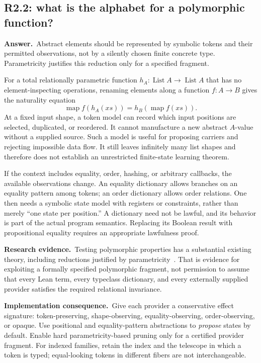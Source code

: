 \documentclass[11pt,a4paper]{article}
\theoremstyle{definition}
\theoremstyle{remark}
\newcommand{\code}[1]{\texttt{\detokenize{#1}}}
\newcommand{\List}{\operatorname{List}}
\newcommand{\ans}{\noindent\textbf{Answer.}\ }
\newcommand{\imp}{\par\noindent\textbf{Implementation consequence.}\ }
\newcommand{\lit}{\par\noindent\textbf{Research evidence.}\ }
\begin{document}
\subsection{R2.2: what is the alphabet for a polymorphic function?}\label{q:R2.2}
\ans Abstract elements should be represented by symbolic tokens and their
permitted observations, not by a silently chosen finite concrete type.
Parametricity justifies this reduction only for a specified fragment.

For a total relationally parametric function
$h_A:\List A\to\List A$ that has no element-inspecting operations, renaming
elements along a function $f:A\to B$ gives the naturality equation
\[
 \operatorname{map}f(h_A(xs))=h_B(\operatorname{map}f(xs)).
\]
At a fixed input shape, a token model can record which input positions are
selected, duplicated, or reordered. It cannot manufacture a new abstract
$A$-value without a supplied source. Such a model is useful for proposing
carriers and rejecting impossible data flow. It still leaves infinitely many
list shapes and therefore does not establish an unrestricted finite-state
learning theorem.

If the context includes equality, order, hashing, or arbitrary callbacks,
the available observations change. An equality dictionary allows branches on
an equality pattern among tokens; an order dictionary allows order relations.
One then needs a symbolic state model with registers or constraints, rather
than merely ``one state per position.'' A \code{BEq} dictionary need not be
lawful, and its behavior is part of the actual program semantics. Replacing its
Boolean result with propositional equality requires an appropriate lawfulness
proof.

\lit Testing polymorphic properties has a substantial existing theory,
including reductions justified by parametricity~\cite{parametric-testing}.
That is evidence for exploiting a formally specified polymorphic fragment,
not permission to assume that every Lean term, every typeclass dictionary,
and every externally supplied provider satisfies the required relational
invariance.

\imp Give each provider a conservative effect signature: token-preserving,
shape-observing, equality-observing, order-observing, or opaque. Use positional
and equality-pattern abstractions to \emph{propose} states by default. Enable
hard parametricity-based pruning only for a certified provider fragment.
For indexed families, retain the index and the telescope in which a token is
typed; equal-looking tokens in different fibers are not interchangeable.
\end{document}
